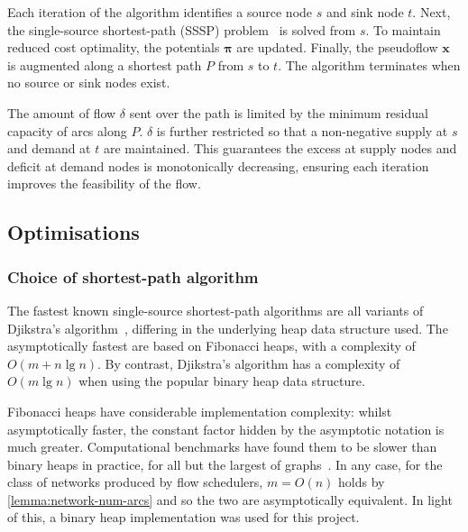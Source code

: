 Each iteration of the algorithm identifies a source node $s$ and sink node $t$. Next, the single-source shortest-path (SSSP) problem~\cite[ch.~24]{CLRS:2009} is solved from $s$. To maintain reduced cost optimality, the potentials $\boldsymbol{\pi}$ are updated. Finally, the pseudoflow $\mathbf{x}$ is augmented along a shortest path $P$ from $s$ to $t$. The algorithm terminates when no source or sink nodes exist.

The amount of flow $\delta$ sent over the path is limited by the minimum residual capacity of arcs along $P$. $\delta$ is further restricted so that a non-negative supply at $s$ and demand at $t$ are maintained. This guarantees the excess at supply nodes and deficit at demand nodes is monotonically decreasing, ensuring each iteration improves the feasibility of the flow.

\subsection{Optimisations}


\subsubsection{Choice of shortest-path algorithm}
The fastest known single-source shortest-path algorithms are all variants of Djikstra's algorithm~\cite[ch.~4]{Ahuja:1993}, differing in the underlying heap data structure used. The asymptotically fastest are based on Fibonacci heaps, with a complexity of $O(m + n\lg n)$. By contrast, Djikstra's algorithm has a complexity of $O(m\lg n)$ when using the popular binary heap data structure.

Fibonacci heaps have considerable implementation complexity: whilst asymptotically faster, the constant factor hidden by the asymptotic notation is much greater. Computational benchmarks have found them to be slower than binary heaps in practice, for all but the largest of graphs~\cite[p.~15]{KiralyKovacs:2012}. In any case, for the class of networks produced by flow schedulers, $m = O(n)$ holds by \cref{lemma:network-num-arcs} and so the two are asymptotically equivalent. In light of this, a binary heap implementation was used for this project.

